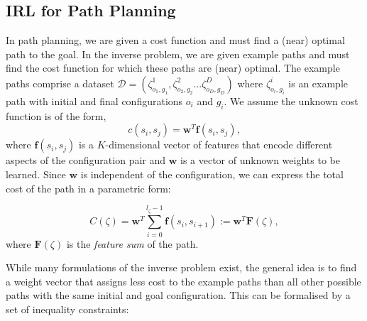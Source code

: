 \documentclass{article}  %
\begin{document}



\subsection{IRL for Path Planning \label{subsec:inverse_problem}}
In path planning, we are given a cost function and must find a (near) optimal path to the goal. In the inverse problem, we are given example paths and must find the cost function for which these paths are (near) optimal.  The example paths comprise a dataset $\mathcal{D} = (\zeta^1_{o_1,g_1},\zeta^2_{o_2,g_2}...\zeta^D_{o_D,g_D})$ where $\zeta^i_{o_i,g_i}$ is an example path with initial and final configurations $o_i$ and $g_i$. We assume the unknown cost function is of the form,
\begin{equation}
	c(s_i,s_j) = \mathbf{w}^T \mathbf{f}(s_i,s_j), \label{eq:inner_prod}
\end{equation}
where $\mathbf{f}(s_i,s_j)$ is a $K$-dimensional vector of features that encode different aspects of the configuration pair and $\mathbf{w}$ is a vector of unknown weights to be learned. Since $\mathbf{w}$ is independent of the configuration, we can express the total cost of the path in a parametric form:

\begin{equation}
	C(\zeta) = \mathbf{w}^T\sum_{i=0}^{l_{\zeta}-1} \mathbf{f}(s_i,s_{i+1}) := \mathbf{w}^T \mathbf{F}(\zeta),
\end{equation}
where $\mathbf{F}(\zeta)$ is the \emph{feature sum} of the path.

While many formulations of the inverse problem exist, the general idea is to find a weight vector that assigns less cost to the example paths than all other possible paths with the same initial and goal configuration.  This can be formalised by a set of inequality constraints:
\end{document}
